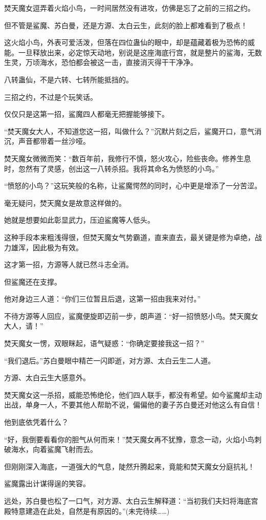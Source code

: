 \begin{this_body}
焚天魔女逗弄着火焰小鸟，一时间居然没有进攻，仿佛是忘了之前的三招之约。

但不管是鲨魔、苏白曼，还是方源、太白云生，此刻的脸上都难看到了极点！

这火焰小鸟，外表可爱活泼，但落在四位蛊仙的眼中，却是蕴藏着极为恐怖的威能。一旦释放出来，必定惊天动地，别说是这座海底行宫，就是整片的鲨海，无数生灵，万顷海水，恐怕都会被这一击，直接消灭得干干净净。

八转蛊仙，不是六转、七转所能抵挡的。

三招之约，不过是个玩笑话。

仅仅只是这第一招，鲨魔四人都毫无把握能够接下。

“焚天魔女大人，不知道您这一招，叫做什么？”沉默片刻之后，鲨魔开口，意气消沉，声音都带着一丝沙哑。

焚天魔女微微而笑：“数百年前，我修行不慎，怒火攻心，险些丧命。修养生息时，忽然有了灵感，创出这一八转杀招。我将其命名为愤怒的小鸟。”

“愤怒的小鸟？”这玩笑般的名称，让鲨魔愕然的同时，心中更是增添了一分苦涩。

毫无疑问，焚天魔女是故意这样做的。

她就是想要如此彰显武力，压迫鲨魔等人低头。

这种手段本来粗浅得很，但焚天魔女气势霸道，直来直去，最关键是修为卓绝，战力雄浑，因此极为有效。

这才第一招，方源等人就已然斗志全消。

但鲨魔还在支撑。

他对身边三人道：“你们三位暂且后退，这第一招由我来对付。”

不待方源等人回应，鲨魔便旋即迈前一步，朗声道：“好一招愤怒小鸟。焚天魔女大人，请！”

焚天魔女一愣，双眼眯起，语气疑惑：“你确定要接我这一招？”

“我们退后。”苏白曼眼中精芒一闪即逝，对方源、太白云生二人道。

方源、太白云生大感意外。

焚天魔女这一杀招，威能恐怖绝伦，他们四人联手，都没有希望。如今鲨魔却主动出战，单身一人，不要其他人帮助不说，偏偏他的妻子苏白曼还对他这么有自信！

他到底依凭着什么？

“好，我倒要看看你的胆气从何而来！”焚天魔女再不犹豫，意念一动，火焰小鸟刺破海水，向着鲨魔飞射而去。

但刚刚深入海底，一道强大的气息，陡然升腾起来，竟能和焚天魔女分庭抗礼！

鲨魔露出计谋得逞的笑容。

远处，苏白曼也松了一口气，对方源、太白云生解释道：“当初我们夫妇将海底宫殿特意建造在此处，自然是有原因的。”(未完待续……)

\end{this_body}

